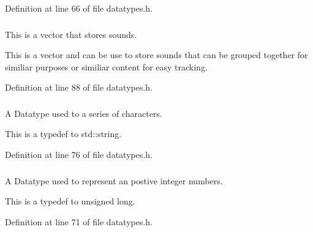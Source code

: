 Definition at line 66 of file datatypes.h.

\hypertarget{namespacephys_ab780c3162da5699fe421f3739ba03fc4}{
\subsubsection[{SoundSet}]{}}
\label{df/dec/namespacephys_ab780c3162da5699fe421f3739ba03fc4}


This is a vector that stores sounds. 

This is a vector and can be use to store sounds that can be grouped together for similiar purposes or similiar content for easy tracking. 

Definition at line 88 of file datatypes.h.

\hypertarget{namespacephys_aa03900411993de7fbfec4789bc1d392e}{
\subsubsection[{String}]{}}
\label{df/dec/namespacephys_aa03900411993de7fbfec4789bc1d392e}


A Datatype used to a series of characters. 

This is a typedef to std::string. 

Definition at line 76 of file datatypes.h.

\hypertarget{namespacephys_a460f6bc24c8dd347b05e0366ae34f34a}{
\subsubsection[{Whole}]{}}
\label{df/dec/namespacephys_a460f6bc24c8dd347b05e0366ae34f34a}


A Datatype used to represent an postive integer numbers. 

This is a typedef to unsigned long. 

Definition at line 71 of file datatypes.h.

